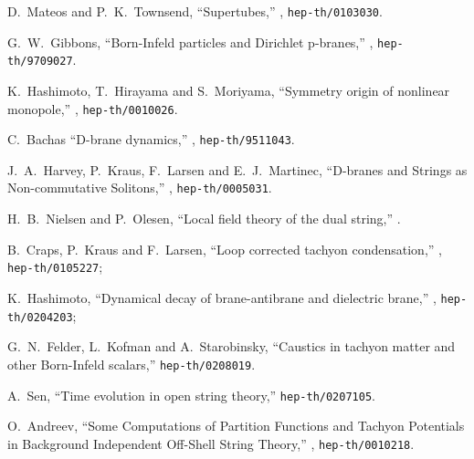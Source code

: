 \documentclass[a4paper,12pt]{article}
\begin{document}
\begin{thebibliography}{99}
D.~Mateos and P.~K.~Townsend,
``Supertubes,''
, {\tt hep-th/0103030}.

G.~W.~Gibbons,
``Born-Infeld particles and Dirichlet p-branes,''
, {\tt hep-th/9709027}.

K.~Hashimoto, T.~Hirayama and S.~Moriyama,
``Symmetry origin of nonlinear monopole,''
, {\tt hep-th/0010026}.

C.\ Bachas 
``D-brane dynamics,''
, {\tt hep-th/9511043}.

%

J.\ A.\ Harvey, P.\ Kraus, F.\ Larsen and E.\ J.\ Martinec,
``D-branes and Strings as Non-commutative Solitons,''
, {\tt hep-th/0005031}.

H.\ B.\ Nielsen and P.\ Olesen, 
``Local field theory of the dual string,''
.

B.~Craps, P.~Kraus and F.~Larsen,
``Loop corrected tachyon condensation,''
, {\tt hep-th/0105227};

K.~Hashimoto,
``Dynamical decay of brane-antibrane and dielectric brane,''
, {\tt hep-th/0204203};

G.~N.~Felder, L.~Kofman and A.~Starobinsky,
``Caustics in tachyon matter and other Born-Infeld scalars,''
{\tt hep-th/0208019}.


A.~Sen,
``Time evolution in open string theory,''
{\tt hep-th/0207105}.

O.\ Andreev, 
``Some Computations of Partition Functions and Tachyon Potentials in
        Background Independent Off-Shell String Theory,''
, {\tt hep-th/0010218}.

\end{thebibliography}
\end{document}
